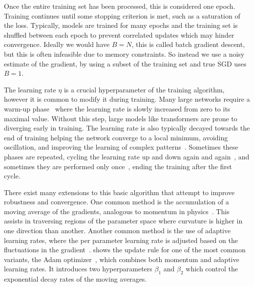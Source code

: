 Once the entire training set has been processed, this is considered one epoch.
Training continues until some stopping criterion is met, such as a saturation of the loss.
Typically, models are trained for many epochs and the training set is shuffled between each epoch to prevent correlated updates which may hinder convergence.
Ideally we would have $B=N$, this is called batch gradient descent, but this is often infeasible due to memory constraints.
So instead we use a noisy estimate of the gradient, by using a subset of the training set and true \Gls{SGD} uses $B=1$.

The learning rate $\eta$ is a crucial hyperparameter of the training algorithm, however it is common to modify it during training.
Many large networks require a warm-up phase~\cite{SGDRStochasticGradient} where the learning rate is slowly increased from zero to its maximal value.
Without this step, large models like transformers are prone to diverging early in training.
The learning rate is also typically decayed towards the end of training helping the network converge to a local minimum, avoiding oscillation, and improving the learning of complex patterns~\cite{HowDoesLearning}.
Sometimes these phases are repeated, cycling the learning rate up and down again and again~\cite{CyclicalLearningRates}, and sometimes they are performed only once~\cite{SuperConvergenceVeryFast}, ending the training after the first cycle.

There exist many extensions to this basic algorithm that attempt to improve robustness and convergence.
One common method is the accumulation of a moving average of the gradients, analogous to momentum in physics~\cite{Momentum}.
This assists in traversing regions of the parameter space where curvature is higher in one direction than another.
Another common method is the use of adaptive learning rates, where the per parameter learning rate is adjusted based on the fluctuations in the gradient~\cite{Adagrad, RMSProp}.
 shows the update rule for one of the most common variants, the Adam optimizer~\cite{Adam}, which combines both momentum and adaptive learning rates.
It introduces two hyperparameters $\beta_1$ and $\beta_2$ which control the exponential decay rates of the moving averages.

